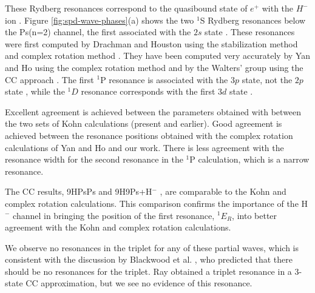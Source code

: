 \documentclass[preprint,showpacs,preprintnumbers,amsmath,amssymb,longbibliography,pra,aps]{revtex4-1}
\begin{document}
These Rydberg resonances correspond to the quasibound state of $e^+$ with the $H^-$ ion \cite{Drachman1979}.
Figure \ref{fig:spd-wave-phases}(a) shows the two $^1$S Rydberg resonances below the
Ps(n=2) channel, the first associated with the $2s$ state \cite{DiRienzi2002b}.
These resonances were first computed by Drachman and Houston using the stabilization
method and complex rotation method \cite{Drachman1975}. They have been computed very accurately by Yan and Ho
using the complex rotation method \cite{Yan1999} and by the Walters' group using the CC approach \cite{Walters2004}. The first $^1$P resonance is associated with the $3p$ state, not the $2p$ state \cite{DiRienzi2002b}, while the $^1D$ resonance corresponds with the first $3d$ state \cite{DiRienzi2002a}.

Excellent agreement is achieved between the parameters obtained with between the two sets of Kohn calculations (present and earlier). Good agreement is achieved between the resonance positions obtained with the complex rotation calculations of Yan and Ho \cite{Yan1999,Yan1998a,Ho1998,Ho2000} and our work. There is less agreement with the resonance width for the second resonance in the $^1$P calculation, which is a narrow resonance. 

The CC results, 9HPsPs \cite{Blackwood2002} and 9H9Ps+H$^-$ \cite{Walters2004}, are comparable to the Kohn and complex rotation calculations. This comparison confirms the importance of the H$^-$ channel in bringing the position of the first resonance, $^1E_R$, into better agreement with the Kohn and complex rotation calculations.

We observe no resonances in the triplet for any of these partial waves, which is consistent with the discussion by Blackwood et al. \cite{Blackwood2002}, who predicted that there should be no resonances for the triplet. Ray \cite{Ray2006} obtained a triplet resonance in a 3-state CC approximation, but we see no evidence of this resonance.
\end{document}
